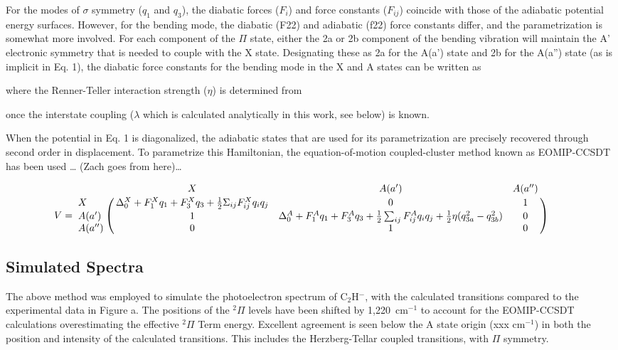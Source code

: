 \documentclass[journal=jpcafh,manuscript=article,layout=onecolumn, 12pt]{achemso}
\begin{document}
For the modes of $\sigma$ symmetry ($q_1$ and $q_3$), the diabatic forces ($F_i$) and force constants ($F_{ij}$) coincide with those of the adiabatic potential energy surfaces.   However, for the bending mode, the diabatic (F22) and adiabatic (f22) force constants differ, and the parametrization is somewhat more involved.   For each component of the $\Pi$ state, either the 2a or 2b component of the bending vibration will maintain the A' electronic symmetry that is needed to couple with the X state.  Designating these as 2a for the A(a') state and 2b for the A(a'') state (as is implicit in Eq. 1), the diabatic force constants for the bending mode in the X and A states can be written as 

where the Renner-Teller interaction strength ($\eta$) is determined from 

once the interstate coupling ($\lambda$ which is calculated analytically in this work, see below) is known.

When the potential in Eq. 1 is diagonalized, the adiabatic states that are used for its parametrization are precisely recovered through second order in displacement. To parametrize this Hamiltonian, the equation-of-motion coupled-cluster method known as EOMIP-CCSDT has been used … (Zach goes from here)…



\begin{equation}
V = \bordermatrix{ & X & A(a') & A(a'') \cr
	X & {\Delta_0^X+F_1^Xq_1+F_3^Xq_3+   
		\frac{1}{2} \Sigma_{ij}F^X_{ij}q_iq_j}& 0 & 1 \cr
	A(a') & 1 & \Delta^A_0+F^A_1q_1+F^A_3q_3+\frac{1}{2}\sum_{ij}F^A_{ij}q_iq_j+\frac{1}{2}\eta(q_{3a}^2-q_{3b}^2) & 0 \cr
	A(a'') & 0 & 1 & 0 } \qquad
\end{equation}

\subsection{Simulated Spectra}
The above method was employed to simulate the photoelectron spectrum of C$_2$H$^-$, with the calculated transitions compared to the experimental data in Figure a. The positions of the $^2\Pi$ levels have been shifted by 1,220~cm$^{-1}$ to account for the EOMIP-CCSDT calculations overestimating the effective $^2\Pi$ Term energy. Excellent agreement is seen below the A state origin (xxx cm$^{-1}$) in both the position and intensity of the calculated transitions. This includes the Herzberg-Tellar coupled transitions, with $\Pi$ symmetry. 
\end{document}

